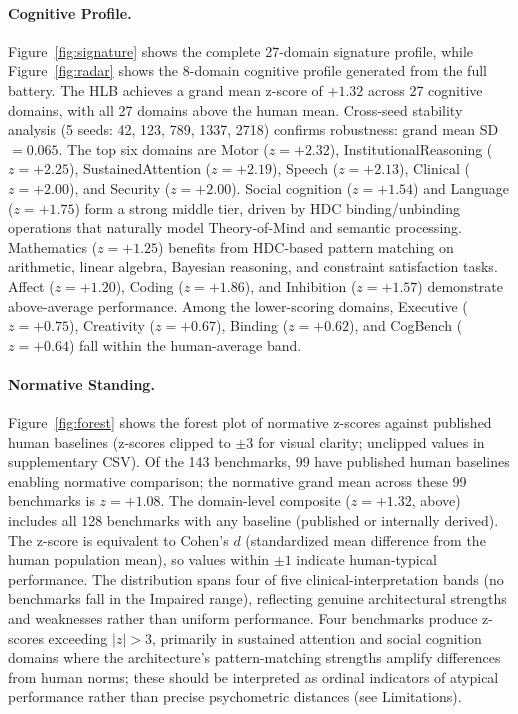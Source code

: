 \documentclass[11pt,letterpaper]{article}
\newcommand{\hlb}{\textsc{HLB}}
\begin{document}
\paragraph{Cognitive Profile.} Figure~\ref{fig:signature} shows the complete 27-domain signature profile, while Figure~\ref{fig:radar} shows the 8-domain cognitive profile generated from the full battery. The \hlb{} achieves a grand mean z-score of $+1.32$ across 27 cognitive domains, with all 27 domains above the human mean. Cross-seed stability analysis (5 seeds: 42, 123, 789, 1337, 2718) confirms robustness: grand mean SD~$= 0.065$. The top six domains are Motor ($z = +2.32$), InstitutionalReasoning ($z = +2.25$), SustainedAttention ($z = +2.19$), Speech ($z = +2.13$), Clinical ($z = +2.00$), and Security ($z = +2.00$). Social cognition ($z = +1.54$) and Language ($z = +1.75$) form a strong middle tier, driven by HDC binding/unbinding operations that naturally model Theory-of-Mind and semantic processing. Mathematics ($z = +1.25$) benefits from HDC-based pattern matching on arithmetic, linear algebra, Bayesian reasoning, and constraint satisfaction tasks. Affect ($z = +1.20$), Coding ($z = +1.86$), and Inhibition ($z = +1.57$) demonstrate above-average performance. Among the lower-scoring domains, Executive ($z = +0.75$), Creativity ($z = +0.67$), Binding ($z = +0.62$), and CogBench ($z = +0.64$) fall within the human-average band.

\paragraph{Normative Standing.} Figure~\ref{fig:forest} shows the forest plot of normative z-scores against published human baselines (z-scores clipped to $\pm 3$ for visual clarity; unclipped values in supplementary CSV). Of the 143 benchmarks, 99 have published human baselines enabling normative comparison; the normative grand mean across these 99 benchmarks is $z = +1.08$. The domain-level composite ($z = +1.32$, above) includes all 128 benchmarks with any baseline (published or internally derived). The z-score is equivalent to Cohen's $d$ (standardized mean difference from the human population mean), so values within $\pm 1$ indicate human-typical performance. The distribution spans four of five clinical-interpretation bands (no benchmarks fall in the Impaired range), reflecting genuine architectural strengths and weaknesses rather than uniform performance. Four benchmarks produce z-scores exceeding $|z| > 3$, primarily in sustained attention and social cognition domains where the architecture's pattern-matching strengths amplify differences from human norms; these should be interpreted as ordinal indicators of atypical performance rather than precise psychometric distances (see Limitations).
\end{document}
